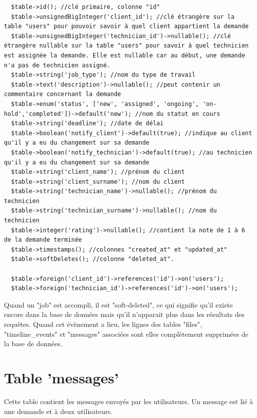 \documentclass[
    iai, %
    eai, %
]{heig-tb}
\begin{document}
\begin{verbatim}
  $table->id(); //clé primaire, colonne "id"
  $table->unsignedBigInteger('client_id'); //clé étrangère sur la table "users" pour pouvoir savoir à quel client appartient la demande
  $table->unsignedBigInteger('technician_id')->nullable(); //clé étrangère nullable sur la table "users" pour savoir à quel technicien est assignée la demande. Elle est nullable car au début, une demande n'a pas de technicien assigné.
  $table->string('job_type'); //nom du type de travail
  $table->text('description')->nullable(); //peut contenir un commentaire concernant la demande
  $table->enum('status', ['new', 'assigned', 'ongoing', 'on-hold','completed'])->default('new'); //nom du statut en cours
  $table->string('deadline'); //date de délai
  $table->boolean('notify_client')->default(true); //indique au client qu'il y a eu du changement sur sa demande
  $table->boolean('notify_technician')->default(true); //au technicien qu'il y a eu du changement sur sa demande
  $table->string('client_name'); //prénom du client
  $table->string('client_surname'); //nom du client
  $table->string('technician_name')->nullable(); //prénom du technicien
  $table->string('technician_surname')->nullable(); //nom du technicien
  $table->integer('rating')->nullable(); //contient la note de 1 à 6 de la demande terminée
  $table->timestamps(); //colonnes "created_at" et "updated_at"
  $table->softDeletes(); //colonne "deleted_at".

  $table->foreign('client_id')->references('id')->on('users');
  $table->foreign('technician_id')->references('id')->on('users');
\end{verbatim}

Quand un "job" est accompli, il est "soft-deleted", ce qui signifie qu'il existe encore dans la base de données mais qu'il n'apparait plus dans les résultats des requêtes.
Quand cet évènement a lieu, les lignes des tables "files", "timeline\_events" et "messages" associées sont elles complètement supprimées de la base de données.

\section{Table 'messages'}
Cette table contient les messages envoyés par les utilisateurs. Un message est lié à une demande et à deux utilisateurs.
\end{document}
